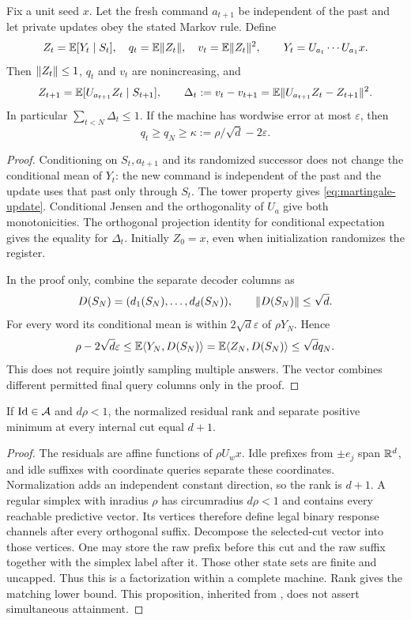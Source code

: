 \begin{lemma}\label{lem:terminal}
Fix a unit seed $x$. Let the fresh command $a_{t+1}$ be independent of the
past and let private updates obey the stated Markov rule. Define
\[
 Z_t=\mathbb E[Y_t\mid S_t],\quad q_t=\mathbb E\lVert Z_t\rVert,\quad
 v_t=\mathbb E\lVert Z_t\rVert^2,\qquad Y_t=U_{a_t}\cdots U_{a_1}x.
\]
Then $\lVert Z_t\rVert\le1$, $q_t$ and $v_t$ are nonincreasing, and
\begin{equation}\label{eq:martingale-update}
 Z_{t+1}=\mathbb E[U_{a_{t+1}}Z_t\mid S_{t+1}],\qquad
 \Delta_t:=v_t-v_{t+1}=\mathbb E\lVert U_{a_{t+1}}Z_t-Z_{t+1}\rVert^2.
\end{equation}
In particular $\sum_{t<N}\Delta_t\le1$. If the machine has wordwise
error at most $\varepsilon$, then
\begin{equation}\label{eq:calibration}
 q_t\ge q_N\ge\kappa:=\rho/\sqrt d-2\varepsilon.
\end{equation}
\end{lemma}
\begin{proof}
Conditioning on $S_t,a_{t+1}$ and its randomized successor does not change
the conditional mean of $Y_t$: the new command is independent of the
past and the update uses that past only through $S_t$. The tower property
gives \eqref{eq:martingale-update}. Conditional Jensen and the
orthogonality of $U_a$ give both monotonicities. The orthogonal projection
identity for conditional expectation gives the equality for $\Delta_t$.
Initially $Z_0=x$, even when initialization randomizes the register.

In the proof only, combine the separate decoder columns as
\[D(S_N)=(d_1(S_N),\ldots,d_d(S_N)),\qquad\lVert D(S_N)\rVert\le\sqrt d.\]
For every word its conditional mean is within $2\sqrt d\varepsilon$
of $\rho Y_N$. Hence
\[
 \rho-2\sqrt d\varepsilon
 \le\mathbb E\langle Y_N,D(S_N)\rangle
 =\mathbb E\langle Z_N,D(S_N)\rangle\le\sqrt d q_N.
\]
This does not require jointly sampling multiple answers. The vector
combines different permitted final query columns only in the proof.
\end{proof}

\begin{proposition}\label{prop:separate}
If $\operatorname{Id}\in\mathcal A$ and $d\rho<1$, the normalized residual rank and
separate positive minimum at every internal cut equal $d+1$.
\end{proposition}
\begin{proof}
The residuals are affine functions of $\rho U_wx$. Idle prefixes from
$\pm e_j$ span $\mathbb R^d$, and idle suffixes with coordinate queries separate
these coordinates. Normalization adds an independent constant direction,
so the rank is $d+1$. A regular simplex with inradius $\rho$ has
circumradius $d\rho<1$ and contains every reachable predictive vector.
Its vertices therefore define legal binary response channels after every
orthogonal suffix. Decompose the selected-cut vector into those vertices.
One may store the raw prefix before this cut and the raw suffix together
with the simplex label after it. Those other state sets are finite and
uncapped. Thus this is a factorization within a complete machine. Rank
gives the matching lower bound. This proposition, inherited from
\cite{GTF36}, does not assert simultaneous attainment.
\end{proof}
